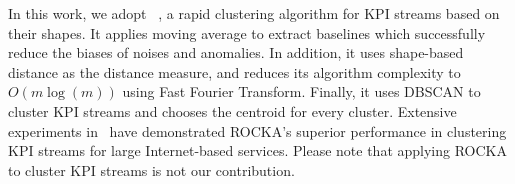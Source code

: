 In this work, we adopt \ROCKA~\cite{lirobust}, a rapid clustering algorithm for KPI streams based on their shapes. 
It applies moving average to extract baselines which successfully reduce the biases of noises and anomalies. 
In addition, it uses shape-based distance
as the distance measure, and reduces its algorithm complexity to $O(m\log(m))$ using Fast Fourier Transform. 
Finally, it uses DBSCAN
to cluster KPI streams and chooses the centroid for every cluster. 
Extensive experiments in~\cite{lirobust} have demonstrated ROCKA's superior performance in clustering KPI streams for large Internet-based services. 
Please note that applying ROCKA to cluster KPI streams is not our contribution.





